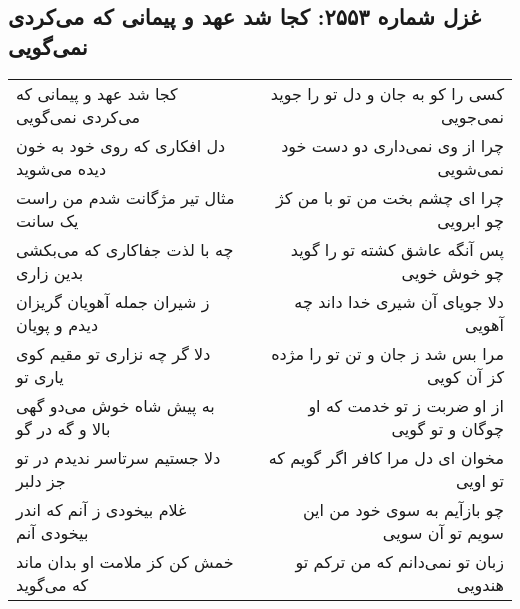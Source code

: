 \begin{center}
\section*{غزل شماره ۲۵۵۳: کجا شد عهد و پیمانی که می‌کردی نمی‌گویی}
\label{sec:2553}
\begin{longtable}{l p{0.5cm} r}
کجا شد عهد و پیمانی که می‌کردی نمی‌گویی
&&
کسی را کو به جان و دل تو را جوید نمی‌جویی
\\
دل افکاری که روی خود به خون دیده می‌شوید
&&
چرا از وی نمی‌داری دو دست خود نمی‌شویی
\\
مثال تیر مژگانت شدم من راست یک سانت
&&
چرا ای چشم بخت من تو با من کژ چو ابرویی
\\
چه با لذت جفاکاری که می‌بکشی بدین زاری
&&
پس آنگه عاشق کشته تو را گوید چو خوش خویی
\\
ز شیران جمله آهویان گریزان دیدم و پویان
&&
دلا جویای آن شیری خدا داند چه آهویی
\\
دلا گر چه نزاری تو مقیم کوی یاری تو
&&
مرا بس شد ز جان و تن تو را مژده کز آن کویی
\\
به پیش شاه خوش می‌دو گهی بالا و گه در گو
&&
از او ضربت ز تو خدمت که او چوگان و تو گویی
\\
دلا جستیم سرتاسر ندیدم در تو جز دلبر
&&
مخوان ای دل مرا کافر اگر گویم که تو اویی
\\
غلام بیخودی ز آنم که اندر بیخودی آنم
&&
چو بازآیم به سوی خود من این سویم تو آن سویی
\\
خمش کن کز ملامت او بدان ماند که می‌گوید
&&
زبان تو نمی‌دانم که من ترکم تو هندویی
\\
\end{longtable}
\end{center}
